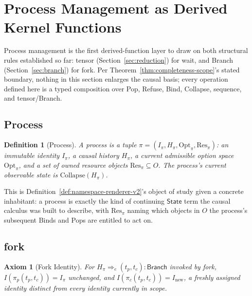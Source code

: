\documentclass[11pt]{article}
\newtheorem{definition}{Definition}[section]
\newtheorem{axiom}{Axiom}[section]
\begin{document}
\section{Process Management as Derived Kernel Functions}
\label{sec:process-management}

Process management is the first derived-function layer to draw on both structural rules established so far: tensor (Section~\ref{sec:reduction}) for wait, and Branch (Section~\ref{sec:branch}) for fork. Per Theorem~\ref{thm:completeness-scope}'s stated boundary, nothing in this section enlarges the causal basis; every operation defined here is a typed composition over Pop, Refuse, Bind, Collapse, sequence, and tensor/Branch.

\subsection{Process}

\begin{definition}[Process]
\label{def:process}
A process is a tuple $\pi = (I_\pi, H_\pi, \mathrm{Opt}_\pi, \mathrm{Res}_\pi)$: an immutable identity $I_\pi$, a causal history $H_\pi$, a current admissible option space $\mathrm{Opt}_\pi$, and a set of owned resource objects $\mathrm{Res}_\pi \subseteq O$. The process's current observable state is $\mathrm{Collapse}(H_\pi)$.
\end{definition}

This is Definition~\ref{def:namespace-renderer-v2}'s object of study given a concrete inhabitant: a process is exactly the kind of continuing $\mathsf{State}$ term the causal calculus was built to describe, with $\mathrm{Res}_\pi$ naming which objects in $O$ the process's subsequent Binds and Pops are entitled to act on.

\subsection{fork}

\begin{axiom}[Fork Identity]
\label{ax:fork-identity}
For $H_\pi \Longrightarrow_e (t_p, t_c) : \mathsf{Branch}$ invoked by fork, $I(\pi_p(t_p,t_c)) = I_\pi$ unchanged, and $I(\pi_c(t_p,t_c)) = I_{\mathrm{new}}$, a freshly assigned identity distinct from every identity currently in scope.
\end{axiom}
\end{document}
